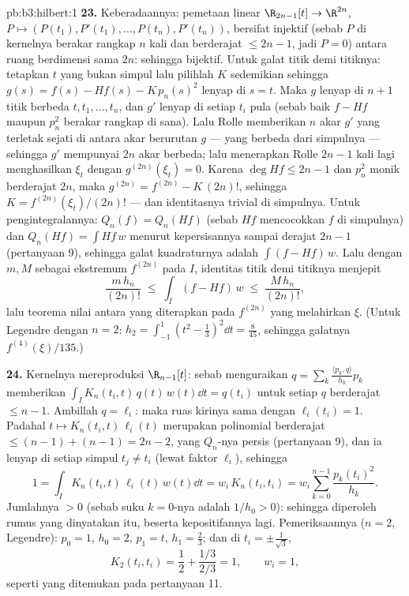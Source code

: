 \begin{solution}{pb:b3:hilbert:1}
\textbf{23.} Keberadaannya: pemetaan linear $\R_{2n-1}[t] \to
\R^{2n}$, $P \mapsto (P(t_1), P'(t_1), \dots, P(t_n),
P'(t_n))$, bersifat injektif (sebab $P$ di kernelnya berakar rangkap $n$
kali dan berderajat $\leq 2n - 1$, jadi $P = 0$) antara ruang
berdimensi sama $2n$: sehingga bijektif. Untuk galat titik demi titiknya: tetapkan $t$
yang bukan simpul lalu pilihlah $K$ sedemikian sehingga $g(s) = f(s) - Hf(s) -
K\,p_n(s)^2$ lenyap di $s = t$. Maka $g$ lenyap di
$n + 1$ titik berbeda $t, t_1, \dots, t_n$, dan $g'$
lenyap di setiap $t_i$ pula (sebab baik $f - Hf$ maupun $p_n^2$ berakar
rangkap di sana). Lalu Rolle memberikan $n$ akar $g'$ yang terletak sejati
di antara akar berurutan $g$ --- yang berbeda dari simpulnya
--- sehingga $g'$ mempunyai $2n$ akar berbeda; lalu menerapkan Rolle $2n - 1$
kali lagi menghasilkan $\xi_t$ dengan $g^{(2n)}(\xi_t) = 0$.
Karena $\deg Hf \leq 2n - 1$ dan $p_n^2$ monik berderajat
$2n$, maka $g^{(2n)} = f^{(2n)} - K\,(2n)!$, sehingga $K =
f^{(2n)}(\xi_t)/(2n)!$ --- dan identitasnya trivial di
simpulnya. Untuk pengintegralannya: $Q_n(f) = Q_n(Hf)$ (sebab $Hf$ mencocokkan $f$
di simpulnya) dan $Q_n(Hf) = \int Hf\,w$ menurut kepersisannya sampai
derajat $2n - 1$ (pertanyaan 9), sehingga galat kuadraturnya adalah
$\int(f - Hf)\,w$. Lalu dengan $m, M$ sebagai ekstremum $f^{(2n)}$ pada
$I$, identitas titik demi titiknya menjepit
\[
\frac{m\,h_n}{(2n)!} \;\leq\; \int_I(f - Hf)\,w
\;\leq\; \frac{M\,h_n}{(2n)!} ,
\]
lalu teorema nilai antara yang diterapkan pada $f^{(2n)}$ yang
 melahirkan $\xi$. (Untuk Legendre dengan $n = 2$: $h_2
= \int_{-1}^1(t^2 - \frac13)^2\dd t = \frac8{45}$, sehingga
galatnya $f^{(4)}(\xi)/135$.)

\textbf{24.} Kernelnya mereproduksi $\R_{n-1}[t]$: sebab menguraikan
$q = \sum_k\frac{\langle p_k, q\rangle}{h_k}p_k$ memberikan
$\int_I K_n(t_i, t)\,q(t)\,w(t)\dd t = q(t_i)$ untuk setiap
$q$ berderajat $\leq n - 1$. Ambillah $q = \ell_i$: maka ruas kirinya
sama dengan $\ell_i(t_i) = 1$. Padahal $t \mapsto K_n(t_i,
t)\,\ell_i(t)$ merupakan polinomial berderajat $\leq (n - 1) + (n
- 1) = 2n - 2$, yang $Q_n$-nya persis (pertanyaan 9), dan ia
lenyap di setiap simpul $t_j \neq t_i$ (lewat faktor $\ell_i$), sehingga
\[
1 = \int_I K_n(t_i, t)\,\ell_i(t)\,w(t)\dd t
= w_i\,K_n(t_i, t_i)
= w_i\sum_{k=0}^{n-1}\frac{p_k(t_i)^2}{h_k} .
\]
Jumlahnya $> 0$ (sebab suku $k = 0$-nya adalah $1/h_0 > 0$): sehingga diperoleh
rumus yang dinyatakan itu, beserta kepositifannya lagi. Pemeriksaannya ($n = 2$,
Legendre): $p_0 = 1$, $h_0 = 2$, $p_1 = t$, $h_1 = \frac23$;
dan di $t_i = \pm\frac1{\sqrt3}$,
\[
K_2(t_i, t_i) = \frac12 + \frac{1/3}{2/3} = 1,
\qquad w_i = 1,
\]
seperti yang ditemukan pada pertanyaan 11.


\end{solution}
